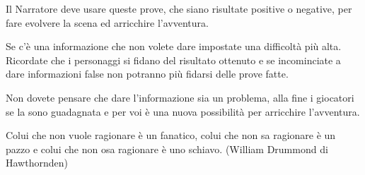 \begin{multicols}{2}
Il Narratore deve usare queste prove, che siano risultate positive o negative, per fare evolvere la scena ed arricchire l'avventura.

Se c'è una informazione che non volete dare impostate una difficoltà più alta.
Ricordate che i personaggi si fidano del risultato ottenuto e se incominciate a dare informazioni false non potranno più fidarsi delle prove fatte.

Non dovete pensare che dare l'informazione sia un problema, alla fine i giocatori se la sono guadagnata e per voi è una nuova possibilità per arricchire l'avventura.

\end{multicols}

\vfill

\begin{enfasi}{
Colui che non vuole ragionare è un fanatico, colui che non sa ragionare è un pazzo e colui che non osa ragionare è uno schiavo. (William Drummond di Hawthornden)
}\end{enfasi}

\pagebreak
